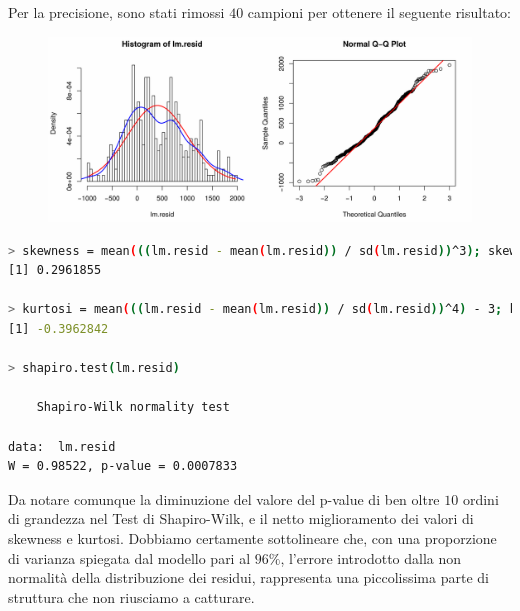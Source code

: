 \documentclass[11pt,a4paper]{article}
\begin{document}
\vspace{-2.2cm}\noindent
Per la precisione, sono stati rimossi $40$ campioni per ottenere il seguente
risultato:
\vspace{-0.1cm}
\begin{figure}[H]
	\begin{center}
		\hspace*{-1.5cm}
		\includegraphics[scale=0.7]{imgs/residuals_2.pdf}
	\end{center}
\end{figure}
\vspace{-1.1cm}
\begin{lstlisting}[language=bash,basicstyle=\tiny,tabsize=2,frame = single]
> skewness = mean(((lm.resid - mean(lm.resid)) / sd(lm.resid))^3); skewness
[1] 0.2961855

> kurtosi = mean(((lm.resid - mean(lm.resid)) / sd(lm.resid))^4) - 3; kurtosi
[1] -0.3962842

> shapiro.test(lm.resid)

	Shapiro-Wilk normality test

data:  lm.resid
W = 0.98522, p-value = 0.0007833
\end{lstlisting}
Da notare comunque la diminuzione del valore del p-value di ben oltre $10$
ordini di grandezza nel Test di Shapiro-Wilk, e il netto miglioramento dei
valori di skewness e kurtosi. Dobbiamo certamente sottolineare che, con una
proporzione di varianza spiegata dal modello pari al $96\%$, l'errore introdotto
dalla non normalit\`a della distribuzione dei residui, rappresenta una
piccolissima parte di struttura che non riusciamo a catturare.
\end{document}
